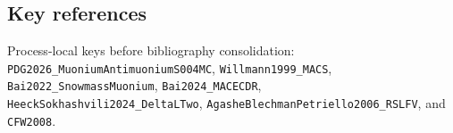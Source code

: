 \subsection*{Key references}
Process-local keys before bibliography consolidation:
\texttt{PDG2026\_MuoniumAntimuoniumS004MC}, \texttt{Willmann1999\_MACS},
\texttt{Bai2022\_SnowmassMuonium}, \texttt{Bai2024\_MACECDR},
\texttt{HeeckSokhashvili2024\_DeltaLTwo},
\texttt{AgasheBlechmanPetriello2006\_RSLFV}, and \texttt{CFW2008}.
